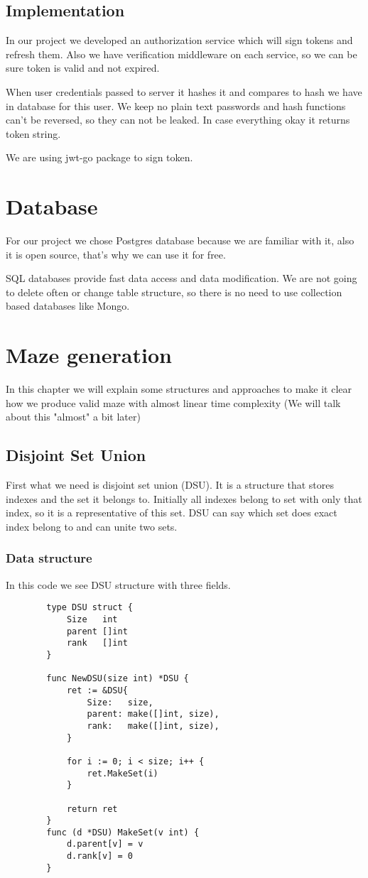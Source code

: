 	\subsection{Implementation}
	In our project we developed an authorization service which will sign tokens and refresh them. Also we have verification middleware on each service, so we can be sure token is valid and not expired.
	
		When user credentials passed to server it hashes it and compares to hash we have in database for this user. We keep no plain text passwords and hash functions can't be reversed, so they can not be leaked. In case everything okay it returns token string.
		
		We are using jwt-go package to sign token.
		
	
\section{Database}
	For our project we chose Postgres \cite{PostgreSQL} database because we are familiar with it, also it is open source, that's why we can use it for free.
	
	SQL databases provide fast data access and data modification. We are not going to delete often or change table structure, so there is no need to use collection based databases like Mongo.
	
\section{Maze generation}
	In this chapter we will explain some structures and approaches to make it clear how we produce valid maze with almost linear time complexity (We will talk about this "almost" a bit later)
	\subsection{Disjoint Set Union}
	First what we need is disjoint set union (DSU). It is a structure that stores indexes and the set it belongs to. Initially all indexes belong to set with only that index, so it is a representative of this set. DSU can say which set does exact index belong to and can unite two sets.
		\subsubsection{Data structure}
		In this code we see DSU structure with three fields. 

		\begin{lstlisting}
		type DSU struct {
			Size   int
			parent []int
			rank   []int
		}

		func NewDSU(size int) *DSU {
			ret := &DSU{
				Size:   size,
				parent: make([]int, size),
				rank:   make([]int, size),
			}

			for i := 0; i < size; i++ {
				ret.MakeSet(i)
			}

			return ret
		}
		func (d *DSU) MakeSet(v int) {
			d.parent[v] = v
			d.rank[v] = 0
		}
		\end{lstlisting}
		
